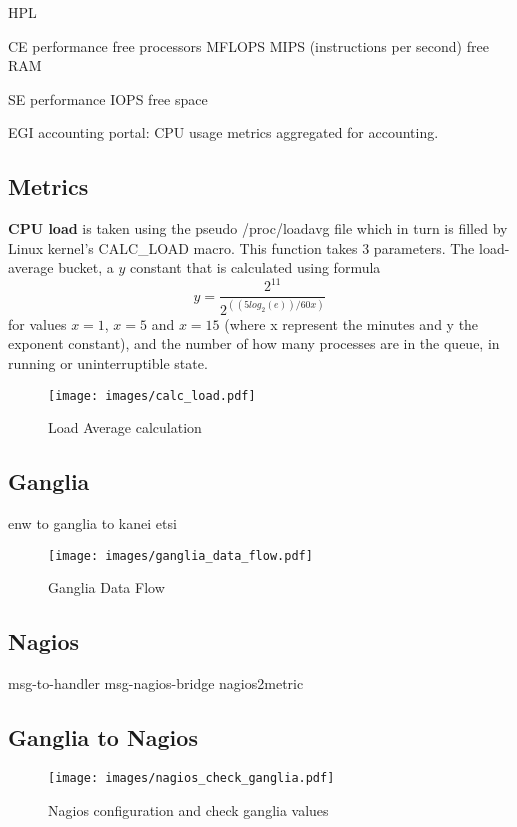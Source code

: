 HPL
\cite{gridbench}

CE performance
free processors
MFLOPS
MIPS (instructions per second)
free RAM

SE performance
IOPS
free space

EGI accounting portal: CPU usage metrics aggregated for accounting.

\subsection{Metrics}

{\bf CPU load} is taken using the pseudo /proc/loadavg file which in turn is
filled by Linux kernel's CALC\_LOAD macro. This function takes 3 parameters.
The load-average bucket, a $y$ constant that is calculated using formula
\[
y=\frac{2^{11}}{2^{((5log_2(e))/60x)}}
\]
for values $x=1$, $x=5$ and $x=15$ (where x represent the minutes and y the
exponent constant), and the number of how many processes are in the queue, in
running or uninterruptible state.

\begin{figure}[htb]
\centering
 \texttt{[image: images/calc\_load.pdf]}
\caption{Load Average calculation}
\label{figure:calc_load}
\end{figure}


\subsection{Ganglia}
enw to ganglia to kanei etsi
\begin{figure}[htb]
\centering
 \texttt{[image: images/ganglia\_data\_flow.pdf]}
\caption{Ganglia Data Flow}
\label{figure:ganglia_dataflow}
\end{figure}

\subsection{Nagios}
msg-to-handler msg-nagios-bridge
nagios2metric

\subsection{Ganglia to Nagios}
\begin{figure}[htb]
\centering
 \texttt{[image: images/nagios\_check\_ganglia.pdf]}
\caption{Nagios configuration and check ganglia values}
\label{figure:nagios_ganglia}
\end{figure}

